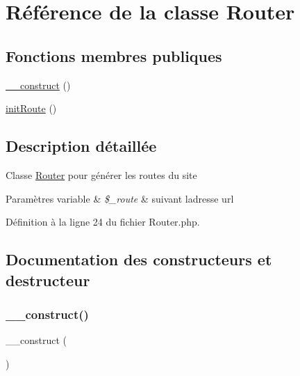 \hypertarget{class_app_1_1_router}{}\section{Référence de la classe Router}
\label{class_app_1_1_router}
\subsection*{Fonctions membres publiques}
\begin{DoxyCompactItemize}
\item 
\hyperlink{class_app_1_1_router_a095c5d389db211932136b53f25f39685}{\+\_\+\+\_\+construct} ()
\item 
\hyperlink{class_app_1_1_router_a6fa8800727e8e7eeab56d569bfa3429b}{init\+Route} ()
\end{DoxyCompactItemize}


\subsection{Description détaillée}
Classe \hyperlink{class_app_1_1_router}{Router} pour générer les routes du site 
\begin{DoxyParams}[1]{Paramètres}
variable & {\em \$\+\_\+route} & suivant l\textquotesingle{}adresse url \\
\hline
\end{DoxyParams}


Définition à la ligne 24 du fichier Router.\+php.



\subsection{Documentation des constructeurs et destructeur}
\mbox{\label{class_app_1_1_router_a095c5d389db211932136b53f25f39685}} 
\subsubsection{\texorpdfstring{\+\_\+\+\_\+construct()}{\_\_construct()}}
{\footnotesize\ttfamily \+\_\+\+\_\+construct (\begin{DoxyParamCaption}{ }\end{DoxyParamCaption})}

